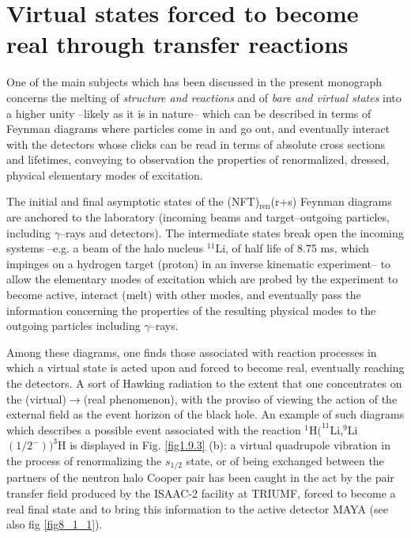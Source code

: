 %
%
%
%
%
\section[Virtual states forced to become real]{Virtual states forced to become real through transfer reactions}\label{C6S4}
One of the main subjects which has been discussed in the present monograph concerns the melting of \textit{structure and reactions} and of \textit{bare and virtual states} into a higher unity --likely as it is in nature-- which can be described in terms of Feynman diagrams where particles come in and go out, and eventually interact with the detectors whose clicks can be read in terms of absolute cross sections and lifetimes, conveying to observation the properties of renormalized, dressed, physical elementary modes of excitation.


The initial and final asymptotic states of the (NFT)$_{\text{ren}}$(r+s) Feynman diagrams are anchored to the laboratory (incoming beams and target--outgoing particles, including $\gamma$--rays and detectors). The intermediate states break open the incoming systems --e.g. a beam of the halo nucleus $^{11}$Li, of half life of 8.75 ms, which impinges on a hydrogen target (proton) in an inverse kinematic experiment-- to allow the elementary modes of excitation which are probed by the experiment to become active, interact (melt) with other modes, and eventually pass the information concerning the properties of the resulting physical modes to the outgoing particles including $\gamma$--rays.


Among these diagrams, one finds those associated with reaction processes in which a virtual state is acted upon and forced to become real, eventually reaching the detectors. A sort of Hawking radiation to the extent that one concentrates on the (virtual)$\to$(real phenomenon), with the proviso of viewing the action of the external field as the event horizon of the black hole.
An example of such diagrams which describes a possible event associated with the reaction $^1$H$(^{11}$Li,$^9$Li$(1/2^-))^3$H is displayed in Fig. \ref{fig1.9.3} (b): a virtual quadrupole vibration in the process of renormalizing the $s_{1/2}$ state, or of being exchanged between the partners of the neutron halo Cooper pair has been caught in the act by the pair transfer field produced by the ISAAC-2 facility at TRIUMF, forced to become a real final state and to bring this information to the active detector MAYA (see also fig \ref{fig8_1_1}).
